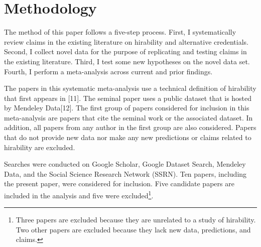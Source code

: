 \documentclass[review]{elsarticle}
\begin{document}



\section{Methodology}

The method of this paper follows a five-step process.
First, I systematically review claims in the existing literature on hirability and alternative credentials.
Second, I collect novel data for the purpose of replicating and testing claims in the existing literature.
Third, I test some new hypotheses on the novel data set.
Fourth, I perform a meta-analysis across current and prior findings.

The papers in this systematic meta-analysis use a technical definition of hirability that first appears in [11].
The seminal paper uses a public dataset that is hosted by Mendeley Data[12].
The first group of papers considered for inclusion in this meta-analysis are
papers that cite the seminal work or the associated dataset.
In addition, all papers from any author in the first group are also considered.
Papers that do not provide new data nor make any new predictions or claims related to hirability are excluded.

Searches were conducted on Google Scholar, Google Dataset Search, Mendeley Data, and the Social Science Research Network (SSRN).
Ten papers, including the present paper, were considered for inclusion.
Five candidate papers are included in the analysis and five were excluded\footnote{
    Three papers are excluded because they are unrelated to a study of hirability.
    Two other papers are excluded because they lack new data, predictions, and claims.
}.
\end{document}
